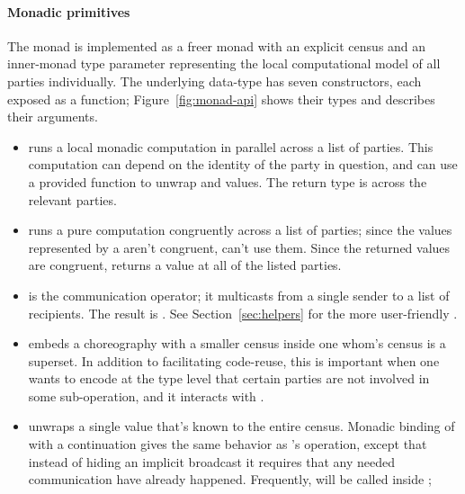 \paragraph{Monadic primitives}
The  monad is implemented as a freer monad with an explicit census
and an inner-monad type parameter representing
the local computational model of all parties individually.
The underlying data-type has seven constructors, each exposed as a function;
Figure~\ref{fig:monad-api} shows their types and describes their arguments.
\begin{itemize}%
    \item {} runs a local monadic computation in parallel across a list of parties.
          This computation can depend on the identity of the party in question,
          and can use a provided function to unwrap  and 
          values.
          The return type is  across the relevant parties.
    \item {} runs a pure computation congruently across a list of parties;
          since the values represented by a  aren't congruent,
           can't use them.
          Since the returned values are congruent,
           returns a  value at all of the listed parties.
    \item {} is the communication operator;
          it multicasts from a single sender to a list of recipients.
          The result is .
          See Section~\ref{sec:helpers} for the more user-friendly \inlinecode{~>}.
    \item {} embeds a choreography with a smaller census inside one whom's
          census is a superset.
          In addition to facilitating code-reuse, this is important when one wants to encode
          at the type level that certain parties are not involved in some sub-operation,
          and it interacts with .
    \item {} unwraps a single value that's known to the entire census.
          Monadic binding of  with a continuation gives the same behavior
          as \HasChor's  operation, except that instead of hiding an implicit
          broadcast it requires that any needed communication have already happened.
          Frequently,  will be called inside ;

\end{itemize}
